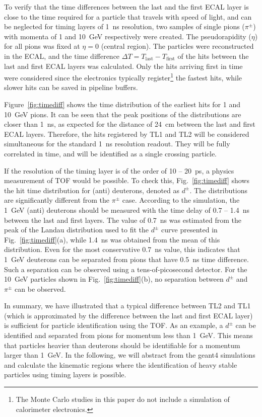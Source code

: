 \documentclass[final,1p,11pt]{elsarticle}
\begin{document}
To verify that the time differences between the last and the first ECAL layer is close to the time
required for a particle that travels with speed of light, and can be neglected for timing layers of 1~ns resolution,
  two samples of single pions ($\pi^\pm$) with momenta of 1 and 10~GeV respectively were created. The
 pseudorapidity ($\eta$) for all pions was fixed at $\eta=0$ (central region). 
The particles were reconstructed in the ECAL, and the time difference $\Delta T= T_{\mathrm{last}}-T_{\mathrm{first}}$ of the hits 
 between the last and first ECAL layers was calculated.
Only the hits arriving first in time were considered since the electronics typically register\footnote{The Monte Carlo studies in
 this paper do not include a simulation of calorimeter electronics.} the fastest hits, while slower hits can be saved in pipeline buffers.

Figure~\ref{fig:timediff} shows the time distribution of the earliest hits 
for 1 and 10~GeV pions. It can be seen that the peak positions of the distributions are closer 
than 1~ns, as expected for the distance of 24~cm between the last and first ECAL layers.
Therefore, the hits registered by TL1 and TL2 will be considered simultaneous for the
standard 1~ns resolution readout. They will be fully correlated in time, and will be identified as a single crossing particle.

If the resolution of the timing layer is of the order of 10 -- 20~ps, a physics measurement of TOF would be possible.
To check this, 
Fig.~\ref{fig:timediff} shows the hit time distribution for (anti) deuterons, denoted as $d^{\pm}$. 
The distributions are significantly different from the $\pi^{\pm}$ case. According to the simulation, the 1~GeV
(anti) deuterons should be measured with the time delay of 0.7 -- 1.4~ns between the last and first layers.
The value of 0.7~ns was estimated from the peak of the Landau distribution used to fit the $d^{\pm}$ 
curve presented in Fig.~\ref{fig:timediff}(a),
while 1.4~ns was obtained from the mean of this distribution. Even for the most conservative 0.7~ns value, this indicates 
 that 1~GeV deuterons can be separated from pions that have 0.5~ns time difference. Such a separation can be observed 
 using a tens-of-picosecond detector.
 For the 10~GeV particles shown in Fig.~\ref{fig:timediff}(b), no separation between $d^{\pm}$ and $\pi^{\pm}$ can be observed.

In summary, we have illustrated that a typical difference between TL2 and TL1 (which is approximated by the difference
between the last and first ECAL layer) is sufficient for particle identification using the TOF.
As an example, a $d^{\pm}$ can be identified and separated from pions for momentum less than 1~GeV.
This means that  particles heavier than deuterons should be identifiable for a momentum larger than 1~GeV.
In the following, we will abstract from the {\sc geant}4 simulations and calculate the kinematic regions  where the 
 identification of heavy stable  particles using timing layers is possible.
 
\end{document}
